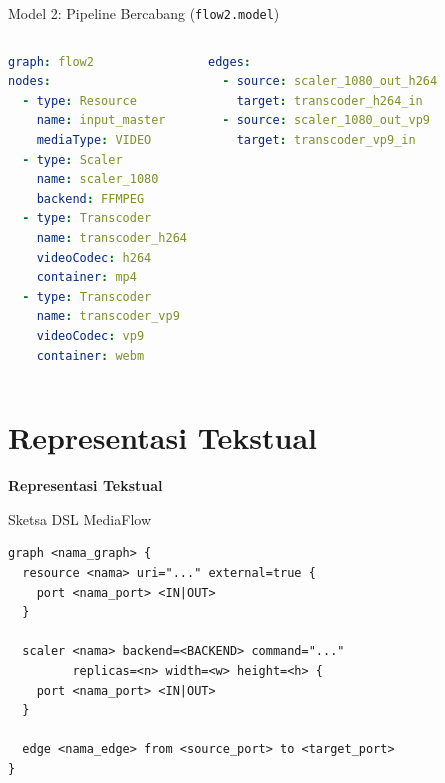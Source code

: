 \documentclass[aspectratio=169, table]{beamer}
\begin{document}
\begin{frame}[fragile]{Model 2: Pipeline Bercabang (\texttt{flow2.model})}

\begin{columns}[T]


\begin{lstlisting}[language=yaml]
graph: flow2
nodes:
  - type: Resource
    name: input_master
    mediaType: VIDEO
  - type: Scaler
    name: scaler_1080
    backend: FFMPEG
  - type: Transcoder
    name: transcoder_h264
    videoCodec: h264
    container: mp4
  - type: Transcoder
    name: transcoder_vp9
    videoCodec: vp9
    container: webm
\end{lstlisting}


\begin{lstlisting}[language=yaml, firstnumber=17]
edges:
  - source: scaler_1080_out_h264
    target: transcoder_h264_in
  - source: scaler_1080_out_vp9
    target: transcoder_vp9_in
\end{lstlisting}

\end{columns}

\end{frame}
\section{Representasi Tekstual}
\begin{frame}{\hfill}
	\centering
	\Huge{\textbf{Representasi Tekstual}}
\end{frame}

\begin{frame}[fragile]{Sketsa DSL MediaFlow}
\vspace{4pt}
\begin{lstlisting}[language=mediaflow]
graph <nama_graph> {
  resource <nama> uri="..." external=true {
    port <nama_port> <IN|OUT>
  }

  scaler <nama> backend=<BACKEND> command="..."
         replicas=<n> width=<w> height=<h> {
    port <nama_port> <IN|OUT>
  }

  edge <nama_edge> from <source_port> to <target_port>
}
\end{lstlisting}
\end{frame}
\end{document}
